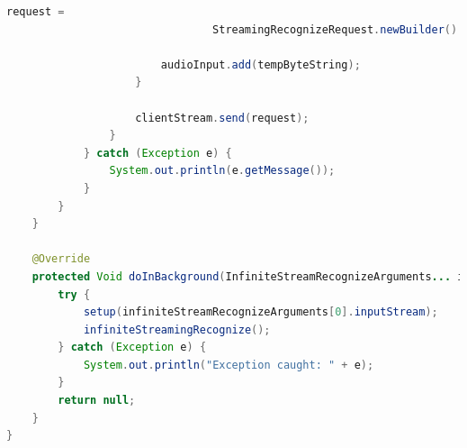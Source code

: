 \documentclass[oneside, 12pt]{book}
\begin{document}
\begin{center}
\begin{lstlisting}[language=java]
                        request =
                                StreamingRecognizeRequest.newBuilder().setAudioContent(tempByteString).build();

                        audioInput.add(tempByteString);
                    }

                    clientStream.send(request);
                }
            } catch (Exception e) {
                System.out.println(e.getMessage());
            }
        }
    }

    @Override
    protected Void doInBackground(InfiniteStreamRecognizeArguments... infiniteStreamRecognizeArguments) {
        try {
            setup(infiniteStreamRecognizeArguments[0].inputStream);
            infiniteStreamingRecognize();
        } catch (Exception e) {
            System.out.println("Exception caught: " + e);
        }
        return null;
    }
}
	\end{lstlisting}
\end{center}
\end{document}
